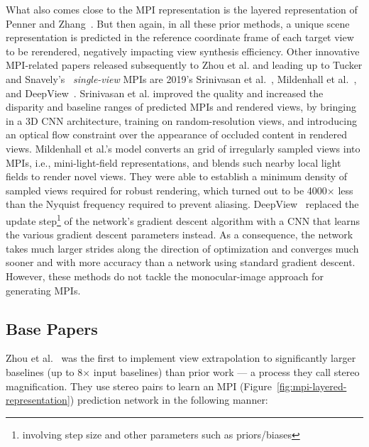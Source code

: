 What also comes close to the MPI representation is the layered representation of Penner and Zhang~\cite{penner_soft_2017}. But then again, in all these prior methods, a unique scene representation is predicted in the reference coordinate frame of each target view to be rerendered, negatively impacting view synthesis efficiency. Other innovative MPI-related papers released subsequently to Zhou et al. and leading up to Tucker and Snavely's~\cite{single_view_mpi} \textit{single-view} MPIs are 2019's Srinivasan et al.~\cite{srinivasan_pushing_2019}, Mildenhall et al.~\cite{mildenhall_local_2019}, and DeepView~\cite{flynn_deepview_2019}. Srinivasan et al. improved the quality and increased the disparity and baseline ranges of predicted MPIs and rendered views, by bringing in a 3D CNN architecture, training on random-resolution views, and introducing an optical flow constraint over the appearance of occluded content in rendered views. Mildenhall et al.'s model converts an grid of irregularly sampled views into MPIs, i.e., mini-light-field representations, and blends such nearby local light fields to render novel views. They were able to establish a minimum density of sampled views required for robust rendering, which turned out to be 4000$\times$ less than the Nyquist frequency required to prevent aliasing. DeepView~\cite{flynn_deepview_2019} replaced the update step\footnote{involving step size and other parameters such as priors/biases} of the network's gradient descent algorithm with a CNN that learns the various gradient descent parameters instead. As a consequence, the network takes much larger strides along the direction of optimization and converges much sooner and with more accuracy than a network using standard gradient descent. However, these methods do not tackle the monocular-image approach for generating MPIs.

\subsection{Base Papers}\label{subsec:base-papers}

Zhou et al.~\cite{zhou2018stereo} was the first to implement view extrapolation to significantly larger baselines (up to 8$\times$ input baselines) than prior work --- a process they call stereo magnification. They use stereo pairs to learn an MPI (Figure~\ref{fig:mpi-layered-representation}) prediction network in the following manner:


